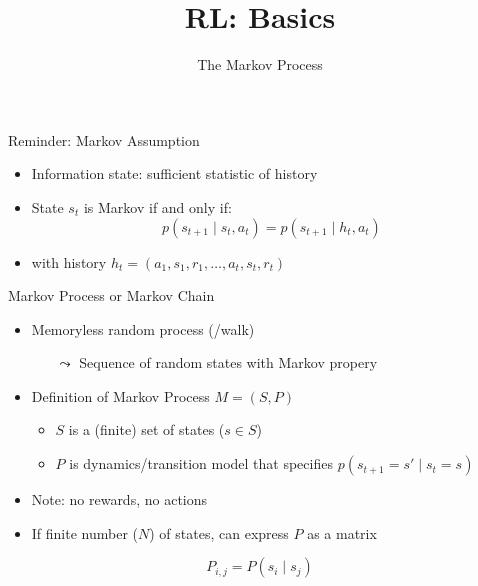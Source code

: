 


\title[Reinforcement Learning: Basics]{RL: Basics}
\subtitle{The Markov Process}




	
	\maketitle

\begin{frame}[c]{Reminder: Markov Assumption}

\begin{itemize}
	\item Information state: sufficient statistic of history
	\item State $s_t$ is Markov if and only if:
	$$ p(s_{t+1} \mid s_t, a_t) = p(s_{t+1} \mid h_t, a_t)$$
	\item with history $h_t = (a_1, s_1, r_1, \ldots, a_t, s_t, r_t)$
\end{itemize}

\end{frame}
\begin{frame}[c]{Markov Process or Markov Chain}
	
	\begin{itemize}
		\item Memoryless random process (/walk)
		\begin{itemize}
			\item[$\leadsto$] Sequence of random states with Markov propery
		\end{itemize}
		\item Definition of Markov Process $M = (S, P)$
		\begin{itemize}
			\item $S$ is a (finite) set of states ($s \in S$)
			\item $P$ is dynamics/transition model that specifies $p(s_{t+1} = s' \mid s_t = s)$
		\end{itemize}
		\item Note: no rewards, no actions
		\item If finite number ($N$) of states, can express $P$ as a matrix
	\end{itemize}

$$P_{i,j} = P(s_i \mid s_j) $$
	
\end{frame}
